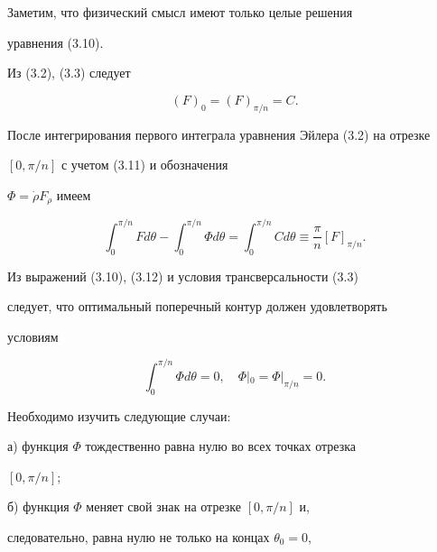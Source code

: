 Заметим, что физический смысл имеют только целые решения


уравнения (3.10).





Из (3.2), (3.3) следует


\begin{equation}


( F )_0 = ( F )_{\pi / n} = C.


\end{equation}


После интегрирования первого интеграла уравнения Эйлера (3.2) на отрезке


$[0, \pi /n]$ с учетом (3.11) и обозначения


$\Phi = \Dot{\rho} F_{\Dot{\rho}}$ имеем


\begin{equation}


\int _0^{\pi/n} F d\theta -


\int _0^{\pi/n} \Phi d\theta =


\int _0^{\pi/n} C d\theta \equiv


\frac{\pi}{n} [F]_{\pi /n}.


\end{equation}


Из выражений (3.10), (3.12) и условия трансверсальности (3.3)


следует, что оптимальный поперечный контур должен удовлетворять


условиям


\begin{equation}


\int _0^{\pi/n} \Phi d\theta = 0, \quad


\Phi |_0 = \Phi |_{\pi/n} = 0. 


\end{equation}





Необходимо изучить следующие случаи:





а) функция $\Phi$ тождественно равна нулю во всех точках отрезка


$[0, \pi /n]$;





б) функция $\Phi$ меняет свой знак на отрезке $[0, \pi /n]$ и,


следовательно, равна нулю не только на концах $\theta_0 = 0$,


